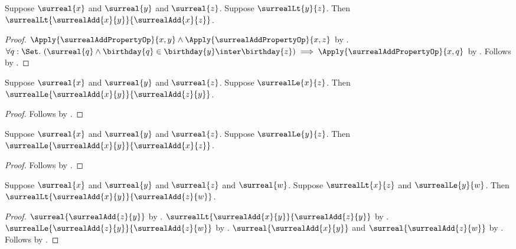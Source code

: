\begin{theorem}\label{surreal_add_lt_right}
    Suppose $\surreal{x}$ and $\surreal{y}$ and $\surreal{z}$.
    Suppose $\surrealLt{y}{z}$.
    Then $\surrealLt{\surrealAdd{x}{y}}{\surrealAdd{x}{z}}$.
\end{theorem}
\begin{proof}
    $\Apply{\surrealAddPropertyOp}{x,y}\land
        \Apply{\surrealAddPropertyOp}{x,z}$
        by .
    $\forall q:\Set.\ (\surreal{q}\land
        \birthday{q}\in\birthday{y}\inter\birthday{z})\implies
        \Apply{\surrealAddPropertyOp}{x,q}$
        by .
    Follows by .
\end{proof}

\begin{corollary}\label{surreal_add_le_left}
    Suppose $\surreal{x}$ and $\surreal{y}$ and $\surreal{z}$.
    Suppose $\surrealLe{x}{z}$.
    Then $\surrealLe{\surrealAdd{x}{y}}{\surrealAdd{z}{y}}$.
\end{corollary}
\begin{proof}
    Follows by .
\end{proof}

\begin{corollary}\label{surreal_add_le_right}
    Suppose $\surreal{x}$ and $\surreal{y}$ and $\surreal{z}$.
    Suppose $\surrealLe{y}{z}$.
    Then $\surrealLe{\surrealAdd{x}{y}}{\surrealAdd{x}{z}}$.
\end{corollary}
\begin{proof}
    Follows by .
\end{proof}

\begin{corollary}\label{surreal_add_lt_le}
    Suppose $\surreal{x}$ and $\surreal{y}$ and
        $\surreal{z}$ and $\surreal{w}$.
    Suppose $\surrealLt{x}{z}$ and $\surrealLe{y}{w}$.
    Then $\surrealLt{\surrealAdd{x}{y}}{\surrealAdd{z}{w}}$.
\end{corollary}
\begin{proof}
    $\surreal{\surrealAdd{z}{y}}$
        by .
    $\surrealLt{\surrealAdd{x}{y}}{\surrealAdd{z}{y}}$
        by .
    $\surrealLe{\surrealAdd{z}{y}}{\surrealAdd{z}{w}}$
        by .
    $\surreal{\surrealAdd{x}{y}}$ and
        $\surreal{\surrealAdd{z}{w}}$ by .
    Follows by .
\end{proof}

